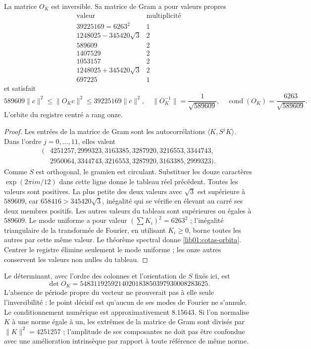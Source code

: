 \begin{theorem}
\label{lib01:marco-ciclico}
La matrice \(O_K\) est inversible. Sa matrice de Gram a pour valeurs propres
\[
\begin{array}{c|c}
 \text{valeur}&\text{multiplicité}\\\hline
 39225169=6263^2&1\\
 1248025-345420\sqrt3&2\\
 589609&2\\
 1407529&2\\
 1053157&2\\
 1248025+345420\sqrt3&2\\
 697225&1
\end{array}
\]
et satisfait
\begin{equation}
 589609\|c\|^2\leq\|O_Kc\|^2\leq39225169\|c\|^2,
 \quad
 \|O_K^{-1}\|=\frac1{\sqrt{589609}},\quad
 \operatorname{cond}(O_K)=\frac{6263}{\sqrt{589609}}.
 \label{lib01:cotas-orbita}
\end{equation}
L’orbite du registre centré a rang onze.
\end{theorem}
\begin{proof}
Les entrées de la matrice de Gram sont les autocorrélations \(\langle K,S^jK\rangle\). Dans l'ordre \(j=0,\ldots,11\), elles valent
\begin{align*}
 (&4251257,2999323,3163385,3287920,3216553,3344743,\\
  &2950064,3344743,3216553,3287920,3163385,2999323).
\end{align*}
Comme \(S\) est orthogonal, le gramien est circulant. Substituer les douze
caractères \(\exp(2\pi i m/12)\) dans cette ligne donne le tableau réel
précédent. Toutes les valeurs sont positives. La plus petite des deux valeurs
avec \(\sqrt3\) est supérieure à \(589609\), car
\(658416>345420\sqrt3\), inégalité qui se vérifie en élevant au
carré ses deux membres positifs. Les autres valeurs du tableau sont
supérieures ou égales à \(589609\). Le mode uniforme a pour valeur
\((\sum K_i)^2=6263^2\) ; l’inégalité triangulaire de la transformée
de Fourier, en utilisant \(K_i\geq0\), borne toutes les autres par cette même
valeur. Le théorème spectral donne \eqref{lib01:cotas-orbita}. Centrer
le registre élimine seulement le mode uniforme ; les onze autres conservent
les valeurs non nulles du tableau.
\end{proof}

Le déterminant, avec l’ordre des colonnes et l’orientation de \(S\)
fixés ici, est
\[
 \det O_K=5483119259214020183850397930008283625.
\]
L'absence de période propre du vecteur ne prouverait pas à elle seule l'inversibilité : le point décisif est qu'aucun de ses modes de Fourier ne s'annule. Le conditionnement numérique est approximativement \(8.15643\). Si l'on normalise \(K\) à une norme égale à un, les extrêmes de la matrice de Gram sont divisés par \(\|K\|^2=4251257\) ; l'amplitude de ses composantes ne doit pas être confondue avec une amélioration intrinsèque par rapport à toute référence de même norme.

